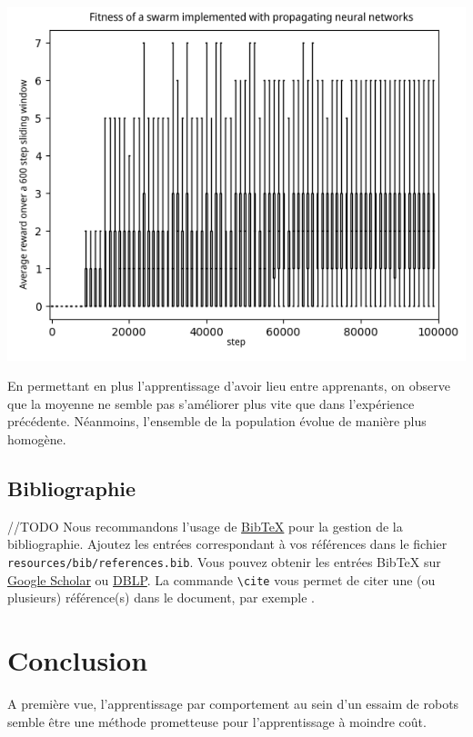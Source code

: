 \documentclass[a4paper, 12pt]{report}
\begin{document}
\begin{center}
	\includegraphics{learner_boxplot}
\end{center}	

	En permettant en plus l'apprentissage d'avoir lieu entre apprenants, on observe que la moyenne ne semble pas s'améliorer plus vite que dans l'expérience précédente. Néanmoins, l'ensemble de la population évolue de manière plus homogène.

    \section{Bibliographie}
//TODO
Nous recommandons l'usage de \href{https://fr.wikipedia.org/wiki/BibTeX}{BibTeX} pour la gestion de la bibliographie. Ajoutez les entrées correspondant à vos références dans le fichier \verb+resources/bib/references.bib+. Vous pouvez obtenir les entrées BibTeX sur \href{https://scholar.google.com}{Google Scholar} ou \href{https://dblp.uni-trier.de}{DBLP}. La commande \verb+\cite+ vous permet de citer une (ou plusieurs) référence(s) dans le document, par exemple \cite{pakin2020comprehensive,RusselNorvig}.

\chapter{Conclusion}

A première vue, l'apprentissage par comportement au sein d'un essaim de robots semble être une méthode prometteuse pour l'apprentissage à moindre coût.
\end{document}
